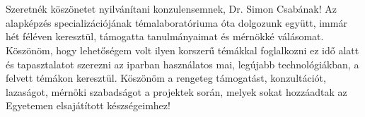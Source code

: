 \chapter*{\koszonetnyilvanitas}

Szeretnék köszönetet nyilvánítani konzulensemnek, Dr. Simon Csabának! Az alapképzés specializációjának témalaboratóriuma óta dolgozunk együtt, immár hét féléven keresztül, támogatta tanulmányaimat és mérnökké válásomat. Köszönöm, hogy lehetőségem volt ilyen korszerű témákkal foglalkozni ez idő alatt és tapasztalatot szerezni az iparban használatos mai, legújabb technológiákban, a felvett témákon keresztül. Köszönöm a rengeteg támogatást, konzultációt, lazaságot, mérnöki szabadságot a projektek során, melyek sokat hozzáadtak az Egyetemen elsajátított készségeimhez!